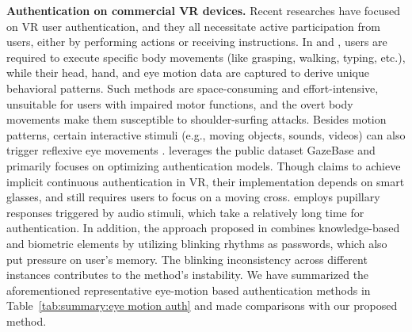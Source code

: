 \documentclass[sigconf]{acmart}
\begin{document}
\noindent \textbf{Authentication on commercial VR devices.} Recent researches \cite{zhu2020blinkey, PfeufferCHI19, BioMove,Zhu2023SoundLockAN, EyeKnowYouToo, ContinuousAuth} have focused on VR user authentication, and they all necessitate active participation from users, either by performing actions or receiving instructions. In \cite{PfeufferCHI19} and \cite{BioMove}, users are required to execute specific body movements (like grasping, walking, typing, etc.), while their head, hand, and eye motion data are captured to derive unique behavioral patterns. Such methods are space-consuming and effort-intensive, unsuitable for users with impaired motor functions, and the overt body movements make them susceptible to shoulder-surfing attacks. Besides motion patterns, certain interactive stimuli (e.g., moving objects, sounds, videos) can also trigger reflexive eye movements \cite{EyeKnowYouToo, ContinuousAuth, Zhu2023SoundLockAN}. \cite{EyeKnowYouToo} leverages the public dataset GazeBase and primarily focuses on optimizing authentication models. Though \cite{ContinuousAuth} claims to achieve implicit continuous authentication in VR, their implementation depends on smart glasses, and still requires users to focus on a moving cross. \cite{Zhu2023SoundLockAN} employs pupillary responses triggered by audio stimuli, which take a relatively long time for authentication.
In addition, the approach proposed in \cite{zhu2020blinkey} combines knowledge-based and biometric elements by utilizing blinking rhythms as passwords, which also put pressure on user's memory. The blinking inconsistency across different instances contributes to the method's instability. We have summarized the aforementioned representative eye-motion based authentication methods in Table~\ref{tab:summary:eye motion auth} and made comparisons with our proposed method.
\end{document}

